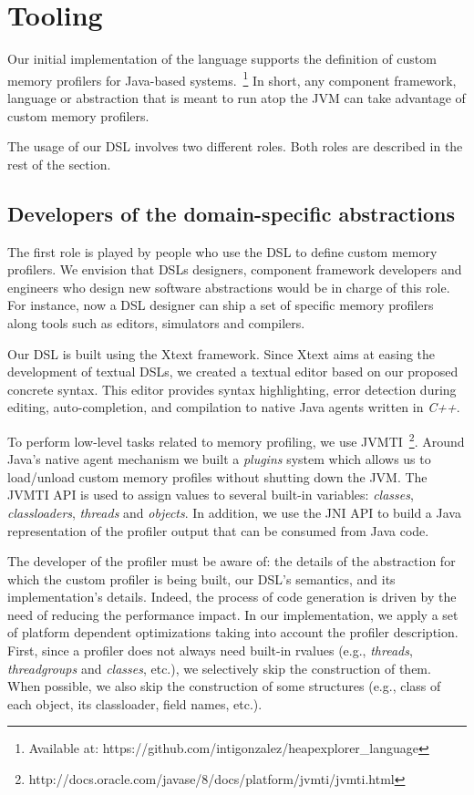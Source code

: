 \section{Tooling}\label{sec:implementation}

Our initial implementation of the language supports the definition of custom memory profilers for Java-based systems.~\footnote{Available at: https://github.com/intigonzalez/heapexplorer\_language}
In short, any component framework, language or abstraction that is meant to run atop the JVM can take advantage of custom memory profilers.

The usage of our DSL involves two different roles.
Both roles are described in the rest of the section.


\subsection{Developers of the domain-specific abstractions}

The first role is played by people who use the DSL to define custom memory profilers.
We envision that DSLs designers, component framework developers and engineers who design new software abstractions would be in charge of this role.
For instance, now a DSL designer can ship a set of specific memory profilers along tools such as editors, simulators and compilers. 

Our DSL is built using the Xtext framework.
Since Xtext aims at easing the development of textual DSLs, we created a textual editor based on our proposed concrete syntax.
This editor provides syntax highlighting, error detection during editing, auto-completion, and compilation to native Java agents written in \textit{C++}.

To perform low-level tasks related to memory profiling, we use JVMTI~\footnote{http://docs.oracle.com/javase/8/docs/platform/jvmti/jvmti.html}.
Around Java's native agent mechanism we built a \textit{plugins} system which allows us to load/unload custom memory profiles without shutting down the JVM.
The JVMTI API is used to assign values to several built-in variables: \textit{classes}, \textit{classloaders}, \textit{threads} and \textit{objects}.
In addition, we use the JNI API to build a Java representation of the profiler output that can be consumed from Java code.

The developer of the profiler must be aware of: the details of the abstraction for which the custom profiler is being built, our DSL's semantics, and its implementation's details.
Indeed, the process of code generation is driven by the need of reducing the performance impact.
In our implementation, we apply a set of platform dependent optimizations taking into account the profiler description.
First, since a profiler does not always need built-in rvalues (e.g., \textit{threads}, \textit{threadgroups} and \textit{classes}, etc.), we selectively skip the construction of them.
When possible, we also skip the construction of some structures (e.g., class of each object, its classloader, field names, etc.).

